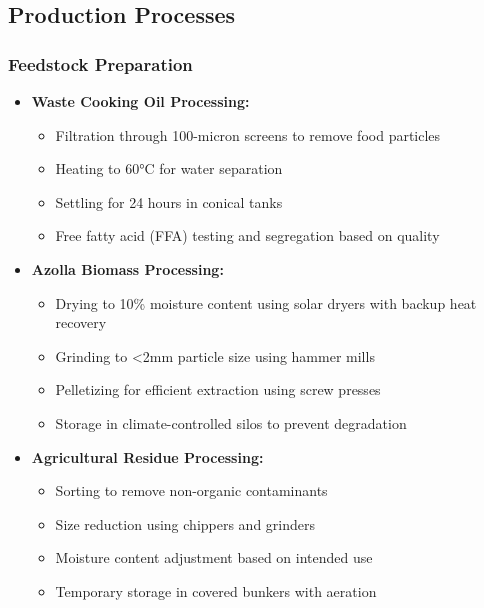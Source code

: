 \subsection{Production Processes}

\subsubsection{Feedstock Preparation} \label{sec:vermicomposting_feedstock}
\begin{itemize}
    \item \textbf{Waste Cooking Oil Processing:}
    \begin{itemize}
        \item Filtration through 100-micron screens to remove food particles
        \item Heating to 60°C for water separation
        \item Settling for 24 hours in conical tanks
        \item Free fatty acid (FFA) testing and segregation based on quality
    \end{itemize}
    
    \item \textbf{Azolla Biomass Processing:}
    \begin{itemize}
        \item Drying to 10\% moisture content using solar dryers with backup heat recovery
        \item Grinding to <2mm particle size using hammer mills
        \item Pelletizing for efficient extraction using screw presses
        \item Storage in climate-controlled silos to prevent degradation
    \end{itemize}
    
    \item \textbf{Agricultural Residue Processing:}
    \begin{itemize}
        \item Sorting to remove non-organic contaminants
        \item Size reduction using chippers and grinders
        \item Moisture content adjustment based on intended use
        \item Temporary storage in covered bunkers with aeration
    \end{itemize}
\end{itemize}

